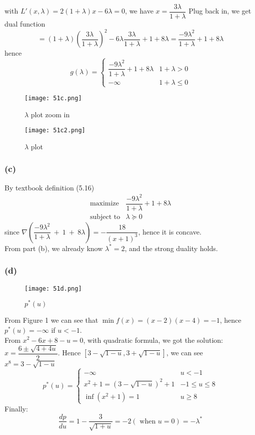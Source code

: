 \documentclass{article}
\begin{document}
with $ L' (x, \lambda) = 2(1 + \lambda)x - 6 \lambda = 0$, we have $x = \dfrac{3\lambda}{1+ \lambda}$
Plug back in, we get dual function
\[= (1 + \lambda) (\dfrac{3\lambda}{1+ \lambda})^2 - 6\lambda \dfrac{3\lambda}{1+ \lambda} + 1 + 8\lambda  = \dfrac{-9\lambda^2}{1+ \lambda}+ 1 + 8\lambda   \]
hence
\[g(\lambda) = \begin{cases}
           \dfrac{-9\lambda^2}{1+ \lambda}+ 1 + 8\lambda & 1+ \lambda > 0\\
          -\infty &  1+ \lambda \le 0
        \end{cases} \]
      \begin{figure}[ht]
\centering
\begin{minipage}{.5\textwidth}
  \centering
  \texttt{[image: 51c.png]}
  \caption{$\lambda$ plot zoom in }

\end{minipage}%
\begin{minipage}{.5\textwidth}
  \centering
  \texttt{[image: 51c2.png]}
  \caption{$\lambda$ plot }

\end{minipage}

\end{figure}

\subsubsection*{(c)}
By textbook definition (5.16)
    \[  \boxed{  \begin{array}{ll}
    \mbox{maximize}   &  \dfrac{-9\lambda^2}{1+ \lambda}+ 1 + 8\lambda  \\
    \mbox{subject to} & \lambda \succeq 0   
         \end{array} 
         }
  \]    
since $\nabla ( \dfrac{-9\lambda^2}{1+\lambda}\:+\:1\:+\:8\lambda) = -\dfrac{18}{\left(x+1\right)^3}$, hence it is concave.\\
From part (b), we already know $\lambda^* = 2$, and the strong duality holds.
\subsubsection*{(d)}
\begin{figure}[h]
\begin{center}
  \texttt{[image: 51d.png]}
\end{center}
\caption{ $p^*(u)$}
\end{figure}
From Figure 1 we can see that $\min f(x) =  (x-2)(x-4) = -1$, hence $p^*(u)   = -\infty$ if $u < -1$.\\
 From $x^2 -6x +8 -u = 0$, with quadratic formula, we got the solution: $x = \dfrac{6 \pm \sqrt{4 + 4u}}{2}$. Hence $[3 - \sqrt{1-u}, 3 + \sqrt{1-u}]$, we can see $x^8 = 3 - \sqrt{1-u}$
\[p^*(u)  = \begin{cases}
-\infty & u < -1 \\
x^2 + 1  = (3 - \sqrt{1-u})^2 + 1 & -1 \le u \le 8 \\
\inf( x^2 +1) = 1& u \ge 8
\end{cases}\]
Finally: 
\[\dfrac{dp}{du} = 1 - \dfrac{3}{\sqrt{1+u}} = -2 (\mbox{ when } u = 0)  = -\lambda^*\]
\end{document}
